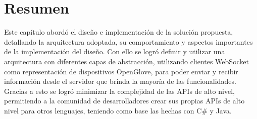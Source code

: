 \section{Resumen}
Este capítulo abordó el diseño e implementación de la solución propuesta, detallando la arquitectura adoptada, su comportamiento y aspectos importantes de la implementación del diseño. Con ello se logró definir y utilizar una arquitectura con diferentes capas de abstracción, utilizando clientes WebSocket como representación de dispositivos OpenGlove, para poder enviar y recibir información desde el servidor que brinda la mayoría de las funcionalidades. Gracias a esto se logró minimizar la complejidad de las APIs de alto nivel, permitiendo a la comunidad de desarrolladores crear sus propias APIs de alto nivel para otros lenguajes, teniendo como base las hechas con C\# y Java.
